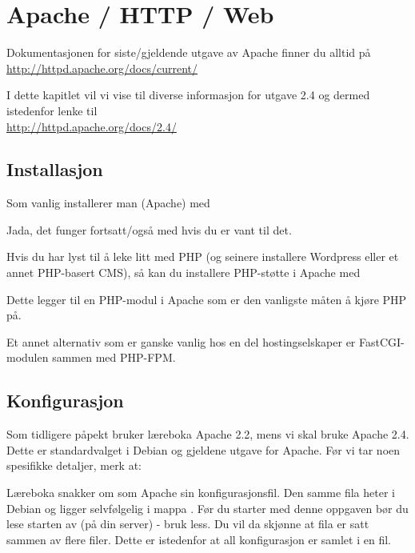 \chapter{Apache / HTTP / Web}  %

Dokumentasjonen for siste/gjeldende utgave av Apache finner
du alltid på\\ \url{http://httpd.apache.org/docs/current/}

I dette kapitlet vil vi vise til diverse informasjon for 
utgave 2.4 og dermed istedenfor lenke til\\
\url{http://httpd.apache.org/docs/2.4/} \cite{docs:apache}

\section{Installasjon}

Som vanlig installerer man (Apache) med 


Jada, det funger fortsatt/også med  hvis du er vant til det.

Hvis du har lyst til å leke litt med PHP (og seinere installere Wordpress
eller et annet PHP-basert CMS), så kan du installere PHP-støtte i Apache med


Dette legger til en PHP-modul i Apache som er den vanligste måten å kjøre PHP på.

Et annet alternativ som er ganske vanlig hos en del hostingselskaper 
er FastCGI-modulen sammen med PHP-FPM.

\section{Konfigurasjon}

Som tidligere påpekt bruker læreboka Apache 2.2, mens vi skal bruke Apache 2.4. 
Dette er standardvalget i Debian og gjeldene utgave for Apache. Før vi tar
noen spesifikke detaljer, merk at:

\begin{remark}
Læreboka snakker om  som Apache sin konfigurasjonsfil. 
Den samme fila heter  i Debian og ligger selvfølgelig i 
mappa . Før du starter med denne oppgaven bør du lese starten 
av  (på din server) - bruk less. Du vil da skjønne at 
fila  er satt sammen av flere filer. Dette er istedenfor at 
all konfigurasjon er samlet i en  fil.
\end{remark}

